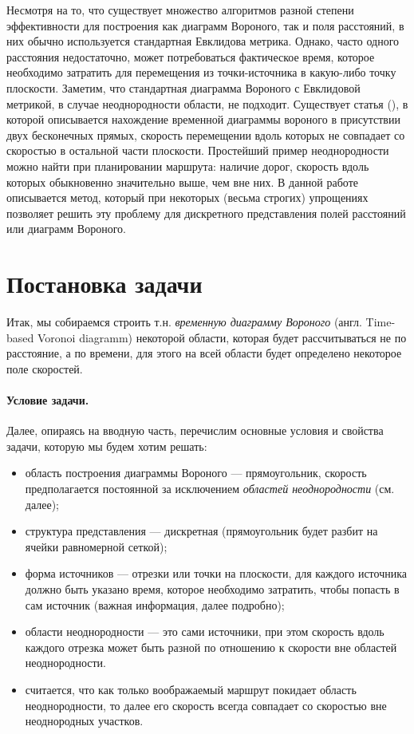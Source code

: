 \documentclass[12pt]{article}
\begin{document}
Несмотря на то, что существует множество алгоритмов разной степени эффективности для построения как диаграмм Вороного, так и поля расстояний, в них обычно используется стандартная Евклидова метрика. Однако, часто одного расстояния недостаточно, может потребоваться фактическое время, которое необходимо затратить для перемещения из точки-источника в какую-либо точку плоскости. Заметим, что стандартная диаграмма Вороного с Евклидовой метрикой, в случае неоднородности области, не подходит.
Существует статья (\cite{timeb}), в которой описывается нахождение временной диаграммы вороного в присутствии двух бесконечных прямых, скорость перемещении вдоль которых не совпадает со скоростью в остальной части плоскости. Простейший пример неоднородности можно найти при планировании маршрута: наличие дорог, скорость вдоль которых обыкновенно значительно выше, чем вне них. В данной работе описывается метод, который при некоторых (весьма строгих) упрощениях позволяет решить эту проблему для дискретного представления полей расстояний или диаграмм Вороного.

\section{Постановка задачи}
\label{task}
Итак, мы собираемся строить т.н. \emph{временную диаграмму Вороного} (англ. Time-based Voronoi diagramm) некоторой области, которая будет рассчитываться не по расстояние, а по времени, для этого на всей области будет определено некоторое поле скоростей. 

\paragraph{Условие задачи.} Далее, опираясь на вводную часть, перечислим основные условия и свойства задачи, которую мы будем хотим решать:
\begin{itemize}
\label{props}
\item область построения диаграммы Вороного --- прямоугольник, скорость предполагается постоянной за исключением \emph{областей неоднородности} (см. далее);
\item структура представления --- дискретная (прямоугольник будет разбит на ячейки равномерной сеткой);
\item форма источников --- отрезки или точки на плоскости, для каждого источника должно быть указано время, которое необходимо затратить, чтобы попасть в сам источник (важная информация, далее подробно);
\item области неоднородности --- это сами источники, при этом скорость вдоль каждого отрезка может быть разной по отношению к скорости вне областей неоднородности.
\item считается, что как только воображаемый маршрут покидает область неоднородности, то далее его скорость всегда совпадает со скоростью вне неоднородных участков.
\end{itemize}
\end{document}
